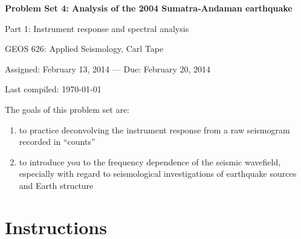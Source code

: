 \documentclass[11pt,titlepage,fleqn]{article}
\begin{document}

\begin{spacing}{1.2}
\begin{center}

{\large \bf Problem Set 4: Analysis of the 2004 Sumatra-Andaman earthquake

Part 1: Instrument response and spectral analysis

}

GEOS 626: Applied Seismology, Carl Tape

Assigned: February 13, 2014 --- Due: February 20, 2014

Last compiled: \today

\end{center}
\end{spacing}


\bigskip
\noindent
The goals of this problem set are:
%
\begin{enumerate}
\item to practice deconvolving the instrument response from a raw seismogram recorded in ``counts''
\item to introduce you to the frequency dependence of the seismic wavefield, especially with regard to seismological investigations of earthquake sources and Earth structure
\end{enumerate}

\section*{Instructions}
\end{document}
